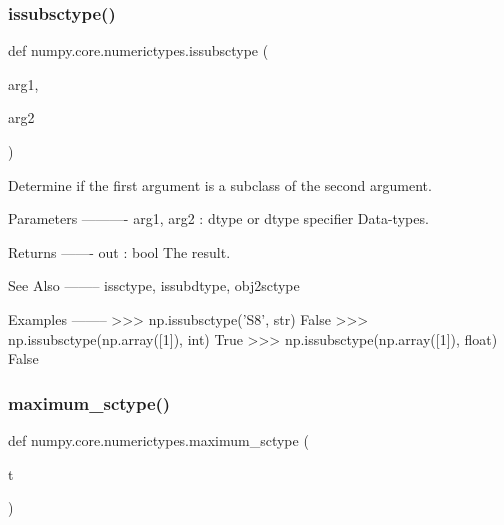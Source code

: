 \subsubsection{\texorpdfstring{issubsctype()}{issubsctype()}}
{\footnotesize\ttfamily def numpy.\+core.\+numerictypes.\+issubsctype (\begin{DoxyParamCaption}\item[{}]{arg1,  }\item[{}]{arg2 }\end{DoxyParamCaption})}

\begin{DoxyVerb}Determine if the first argument is a subclass of the second argument.

Parameters
----------
arg1, arg2 : dtype or dtype specifier
    Data-types.

Returns
-------
out : bool
    The result.

See Also
--------
issctype, issubdtype, obj2sctype

Examples
--------
>>> np.issubsctype('S8', str)
False
>>> np.issubsctype(np.array([1]), int)
True
>>> np.issubsctype(np.array([1]), float)
False\end{DoxyVerb}
 \mbox{\label{namespacenumpy_1_1core_1_1numerictypes_a97df80194c7466a06b95f037f0d5a844}} 
\subsubsection{\texorpdfstring{maximum\+\_\+sctype()}{maximum\_sctype()}}
{\footnotesize\ttfamily def numpy.\+core.\+numerictypes.\+maximum\+\_\+sctype (\begin{DoxyParamCaption}\item[{}]{t }\end{DoxyParamCaption})}

